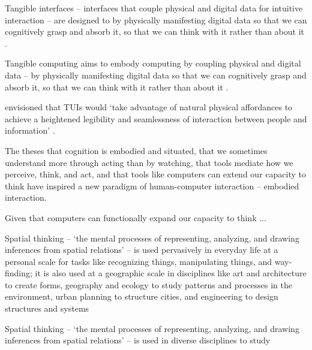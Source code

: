 Tangible interfaces -- interfaces that couple physical and digital data for intuitive interaction \citep{Dourish2001} -- 
are designed to by physically manifesting digital data so that we can cognitively grasp and absorb it,
so that we can think with it rather than about it \citep{Kirsh2013}. 


Tangible computing aims to embody computing 
by coupling physical and digital data \citep{Dourish2001} -- 
by physically manifesting digital data so that we can cognitively grasp and absorb it,
so that we can think with it rather than about it \citep{Kirsh2013}. 

\citeauthor{Ishii1997} envisioned that TUIs would  `take advantage of natural physical affordances to achieve a heightened legibility and seamlessness of interaction between people and information' \citeyearpar{Ishii1997}. 



The theses
that cognition is embodied and situated,
that we sometimes understand more through acting than by watching,
that tools mediate how we perceive, think, and act, 
and that tools like computers can extend our capacity to think \citep{Kirsh2013}
have inspired a new paradigm of human-computer interaction -- embodied interaction.  



Given that computers can functionally expand our capacity to think \citep{Kirsh2013}
...




Spatial thinking -- `the mental processes of representing, analyzing, and drawing inferences from spatial relations' \cite{Uttal2013} -- 
is used pervasively in everyday life at a personal scale for tasks like recognizing things, manipulating things, and way-finding; 
it is also used at a geographic scale in disciplines like 
art and architecture to create forms, 
geography and ecology to study patterns and processes in the environment, 
urban planning to structure cities,
and 
engineering to design structures and systems









Spatial thinking -- `the mental processes of representing, analyzing, and drawing inferences from spatial relations' \cite{Uttal2013} -- is used in diverse disciplines to study 



